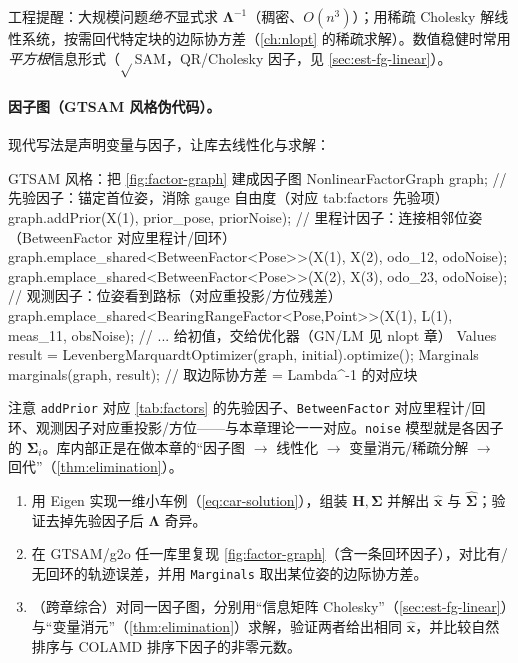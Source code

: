 \noindent 工程提醒：大规模问题\emph{绝不}显式求 $\boldsymbol{\Lambda}^{-1}$（稠密、$O(n^3)$）；用稀疏 Cholesky 解线性系统，按需回代特定块的边际协方差（\cref{ch:nlopt} 的稀疏求解）。数值稳健时常用\emph{平方根}信息形式（$\sqrt{}$SAM，QR/Cholesky 因子，见 \cref{sec:est-fg-linear}）。

\paragraph{因子图（GTSAM 风格伪代码）。}
现代写法是声明变量与因子，让库去线性化与求解：

\begin{codebox}[C++]{GTSAM 风格：把 \cref{fig:factor-graph} 建成因子图}
NonlinearFactorGraph graph;
// 先验因子：锚定首位姿，消除 gauge 自由度（对应 tab:factors 先验项）
graph.addPrior(X(1), prior_pose, priorNoise);
// 里程计因子：连接相邻位姿（BetweenFactor 对应里程计/回环）
graph.emplace_shared<BetweenFactor<Pose>>(X(1), X(2), odo_12, odoNoise);
graph.emplace_shared<BetweenFactor<Pose>>(X(2), X(3), odo_23, odoNoise);
// 观测因子：位姿看到路标（对应重投影/方位残差）
graph.emplace_shared<BearingRangeFactor<Pose,Point>>(X(1), L(1), meas_11, obsNoise);
// ... 给初值，交给优化器（GN/LM 见 nlopt 章）
Values result = LevenbergMarquardtOptimizer(graph, initial).optimize();
Marginals marginals(graph, result);   // 取边际协方差 = Lambda^-1 的对应块
\end{codebox}

\noindent 注意 \texttt{addPrior} 对应 \cref{tab:factors} 的先验因子、\texttt{BetweenFactor} 对应里程计/回环、观测因子对应重投影/方位——与本章理论一一对应。\texttt{noise} 模型就是各因子的 $\boldsymbol{\Sigma}_i$。库内部正是在做本章的“因子图 $\to$ 线性化 $\to$ 变量消元/稀疏分解 $\to$ 回代”（\cref{thm:elimination}）。

\begin{practice}
\begin{enumerate}
  \item 用 Eigen 实现一维小车例（\cref{eq:car-solution}），组装 $\mathbf{H},\boldsymbol{\Sigma}$ 并解出 $\hat{\mathbf{x}}$ 与 $\hat{\boldsymbol{\Sigma}}$；验证去掉先验因子后 $\boldsymbol{\Lambda}$ 奇异。
  \item 在 GTSAM/g2o 任一库里复现 \cref{fig:factor-graph}（含一条回环因子），对比有/无回环的轨迹误差，并用 \texttt{Marginals} 取出某位姿的边际协方差。
  \item （跨章综合）对同一因子图，分别用“信息矩阵 Cholesky”（\cref{sec:est-fg-linear}）与“变量消元”（\cref{thm:elimination}）求解，验证两者给出相同 $\hat{\mathbf{x}}$，并比较自然排序与 COLAMD 排序下因子的非零元数。
\end{enumerate}
\end{practice}

